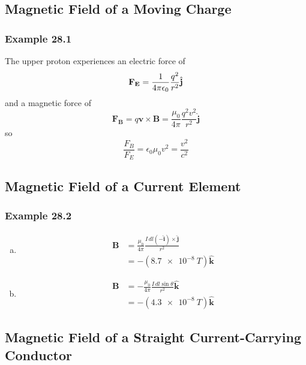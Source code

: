 \documentclass{article}
\begin{document}
\subsection{Magnetic Field of a Moving Charge}

\subsubsection{Example 28.1}

The upper proton experiences an electric force of \[\mathbf{F_E} = \frac{1}{4 \pi \epsilon_0} \frac{q^2}{r^2} \hat{\mathbf{j}}\] and a magnetic force of \[\mathbf{F_B} = q \mathbf{v} \times \mathbf{B} = \frac{\mu_0}{4 \pi} \frac{q^2 v^2}{r^2} \hat{\mathbf{j}}\] so \[\frac{F_B}{F_E} = \epsilon_0 \mu_0 v^2 = \frac{v^2}{c^2}\]

\subsection{Magnetic Field of a Current Element}

\subsubsection{Example 28.2}

\begin{enumerate}[(a)]
  \item

        \begin{align*}
          \mathbf{B} & = \frac{\mu_0}{4 \pi} \frac{I \,dl (-\hat{\mathbf{i}}) \times \hat{\mathbf{j}}}{r^2} \\
                     & = -(\qty{8.7e-8}{T}) \hat{\mathbf{k}}
        \end{align*}

  \item

        \begin{align*}
          \mathbf{B} & = -\frac{\mu_0}{4 \pi} \frac{I \,dl \sin \theta}{r^2} \hat{\mathbf{k}} \\
                     & = -(\qty{4.3e-8}{T}) \hat{\mathbf{k}}
        \end{align*}
\end{enumerate}

\subsection{Magnetic Field of a Straight Current-Carrying Conductor}
\end{document}
